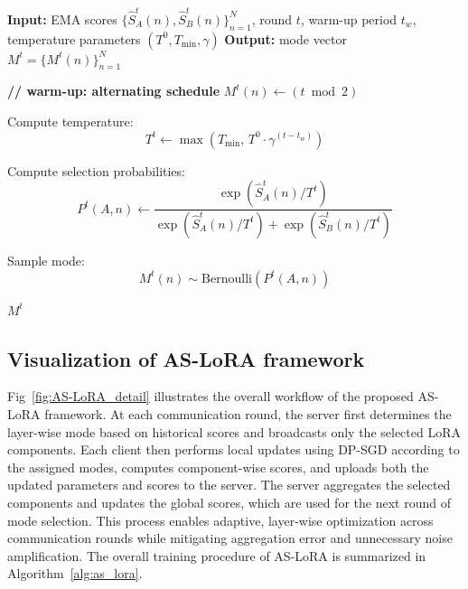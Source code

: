 \begin{algorithm}[h]
\caption{Mode Selection $\mathcal{M}(\cdot)$ }
\label{alg:mode_selection}
\begin{algorithmic}[1]

\STATE \textbf{Input:} EMA scores $\{\hat{S}_A^t(n), \hat{S}_B^t(n)\}_{n=1}^{N}$, round $t$, warm-up period $t_w$, temperature parameters $(T^0, T_{\min}, \gamma)$
\STATE \textbf{Output:} mode vector $M^t = \{M^t(n)\}_{n=1}^{N}$

    \STATE \textbf{// warm-up: alternating schedule}
        \STATE $M^t(n) \leftarrow (t \bmod 2)$
    \ENDFOR

\ELSE
    \STATE Compute temperature:
    \[
    T^t \leftarrow \max\!\left(T_{\min},\, T^0 \cdot \gamma^{(t-t_w)}\right)
    \]


        \STATE Compute selection probabilities:
        \[
        P^t(A,n) \leftarrow 
        \frac{\exp\!\left(\hat{S}_A^t(n)/T^t\right)}
        {\exp\!\left(\hat{S}_A^t(n)/T^t\right) + \exp\!\left(\hat{S}_B^t(n)/T^t\right)}
        \]

        \STATE Sample mode:
        \[
        M^t(n) \sim \mathrm{Bernoulli}(P^t(A,n))
        \]

    \ENDFOR
\ENDIF

\RETURN $M^t$

\end{algorithmic}
\end{algorithm}
\FloatBarrier

\subsection{Visualization of AS-LoRA framework}
Fig~\ref{fig:AS-LoRA_detail} illustrates the overall workflow of the proposed AS-LoRA framework. 
At each communication round, the server first determines the layer-wise mode based on historical scores and broadcasts only the selected LoRA components. 
Each client then performs local updates using DP-SGD according to the assigned modes, computes component-wise scores, and uploads both the updated parameters and scores to the server. 
The server aggregates the selected components and updates the global scores, which are used for the next round of mode selection. 
This process enables adaptive, layer-wise optimization across communication rounds while mitigating aggregation error and unnecessary noise amplification. The overall training procedure of AS-LoRA is summarized in Algorithm~\ref{alg:as_lora}.

